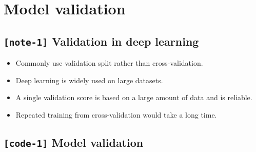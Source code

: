 \documentclass[11pt, twoside]{article}
\begin{document}
    \hypertarget{model-validation}{%
\section{Model validation}\label{model-validation}}

    \hypertarget{note-1-validation-in-deep-learning}{%
\subsection{\texorpdfstring{\texttt{{[}note-1{]}} Validation in deep
learning}{{[}note-1{]} Validation in deep learning}}\label{note-1-validation-in-deep-learning}}

\begin{itemize}
\item
  Commonly use validation split rather than cross-validation.
\item
  Deep learning is widely used on large datasets.
\item
  A single validation score is based on a large amount of data and is
  reliable.
\item
  Repeated training from cross-validation would take a long time.
\end{itemize}

    \hypertarget{code-1-model-validation}{%
\subsection{\texorpdfstring{\texttt{{[}code-1{]}} Model
validation}{{[}code-1{]} Model validation}}\label{code-1-model-validation}}
\end{document}
